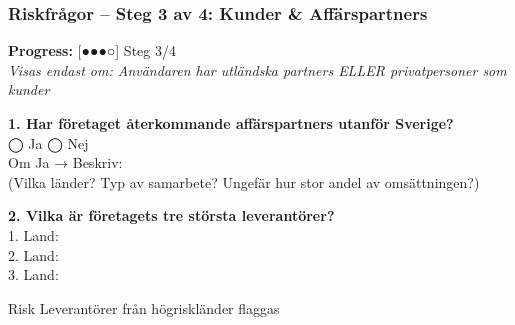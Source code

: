 \documentclass[10pt]{beamer}
\begin{document}
\begin{frame}[label=riskfragor-steg2]
  \vspace{0.5cm}
  \begin{flushright}
    \hyperlink{riskfragor-steg1}{} \hspace{0.3cm} \hyperlink{riskfragor-steg3}{}
  \end{flushright}
\end{frame}

\begin{frame}[label=riskfragor-steg3]
  \frametitle{Riskfrågor – Steg 3 av 4: Kunder \& Affärspartners}

  \begin{center}
    \textbf{Progress:} [●●●○] Steg 3/4\\
    \tiny \textit{Visas endast om: Användaren har utländska partners ELLER privatpersoner som kunder}
  \end{center}

  \vspace{0.3cm}

  \footnotesize

  \textbf{1. Har företaget återkommande affärspartners utanför Sverige?}\\
  ◯ Ja \hspace{0.5cm} ◯ Nej\\
  Om Ja → Beskriv: \underline{\hspace{6cm}}\\
  \tiny (Vilka länder? Typ av samarbete? Ungefär hur stor andel av omsättningen?)

  \vspace{0.3cm}

  \textbf{2. Vilka är företagets tre största leverantörer?}\\
  1. \underline{\hspace{5cm}} Land: \underline{\hspace{2cm}}\\
  2. \underline{\hspace{5cm}} Land: \underline{\hspace{2cm}}\\
  3. \underline{\hspace{5cm}} Land: \underline{\hspace{2cm}}
  \begin{block}{Risk}
    \tiny Leverantörer från högriskländer flaggas
  \end{block}

  \vspace{0.3cm}


\end{frame}
\end{document}
